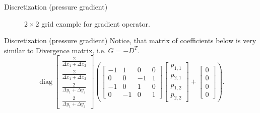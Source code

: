 \documentclass{beamer}
\begin{document}
	\begin{frame}{Discretization (pressure gradient)}
		\begin{figure}[H] %
		  \caption{$2\times 2$ grid example for gradient operator.}\label{fig:G-example-2x2}
		\end{figure}
	\end{frame}
	
	
	\begin{frame}{Discretization (pressure gradient)}
	Notice, that matrix of coefficients below is very similar to Divergence matrix, i.e. $G=-D^T$.
	\begin{equation}\label{eqn:gradient-matrix}
	\operatorname{diag}\left[\begin{array}{cccccc}
	\frac{2}{\Delta x_1+\Delta x_2} \\
	\frac{2}{\Delta x_1+\Delta x_2} \\
	\frac{2}{\Delta y_1+\Delta y_2} \\
	\frac{2}{\Delta y_1+\Delta y_2}
	\end{array}\right]
	\left(\left[\begin{array}{rrrr}
	-1 & 1 & 0 & 0 \\
	0 & 0 & -1 & 1 \\
	-1 & 0 & 1 & 0 \\
	0 & -1 & 0 & 1
	\end{array}\right]
	\begin{bmatrix}{}
	  p_{1,1} \\
	  p_{2,1} \\
	  p_{1,2} \\
	  p_{2,2} 
	\end{bmatrix}
	+\left[\begin{array}{c}
	0 \\
	0 \\
	0 \\
	0 
	\end{array}\right]\right).
	\end{equation}
	\end{frame}
	
\end{document}
